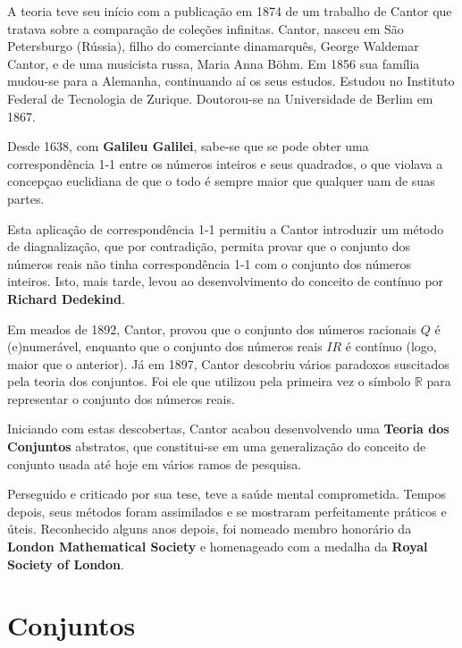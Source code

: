 \inic A teoria teve seu início com a publicação em 1874 de um trabalho de Cantor que tratava sobre a comparação de coleções infinitas. Cantor, nasceu em São Petersburgo (Rússia), filho do comerciante dinamarquês, George Waldemar Cantor, e de uma musicista russa, Maria Anna Böhm. Em 1856 sua família mudou-se para a Alemanha, continuando aí os seus estudos. Estudou no Instituto Federal de Tecnologia de Zurique. Doutorou-se na Universidade de Berlim em 1867.\vskip0.3cm

\inic Desde 1638, com \textbf{Galileu Galilei}, sabe-se que se pode obter uma correspondência 1-1 entre os números inteiros e seus quadrados, o que violava a concepçao euclidiana de que o todo é sempre maior que qualquer uam de suas partes.\vskip0.3cm

\inic Esta aplicação de correspondência 1-1 permitiu a Cantor introduzir um método de diagnalização, que por contradição, permita provar que o conjunto dos números reais não tinha correspondência 1-1 com o conjunto dos números inteiros. Isto, mais tarde, levou ao desenvolvimento do conceito de contínuo por \textbf{Richard Dedekind}. \vskip0.3cm

\inic Em meados de 1892, Cantor, provou que o conjunto dos números racionais $Q$ é (e)numerável, enquanto que o conjunto dos números reais $IR$ é contínuo (logo, maior que o anterior). Já em 1897, Cantor descobriu vários paradoxos suscitados pela teoria dos conjuntos. Foi ele que utilizou pela primeira vez o símbolo ${\displaystyle \mathbb {R}}$ para representar o conjunto dos números reais.\vskip0.3cm


\inic Iniciando com estas descobertas, Cantor acabou desenvolvendo uma \textbf{Teoria dos Conjuntos} abstratos, que constitui-se em uma generalização do conceito de conjunto usada até hoje em vários ramos de pesquisa. \vskip0.3cm


Perseguido e criticado por sua tese, teve a saúde mental comprometida. Tempos depois, seus métodos foram assimilados e se mostraram perfeitamente práticos e úteis. Reconhecido alguns anos depois, foi nomeado membro honorário da \textbf{London Mathematical Society} e homenageado com a medalha da \textbf{Royal Society of London}.\vskip0.3cm




\section{Conjuntos}

